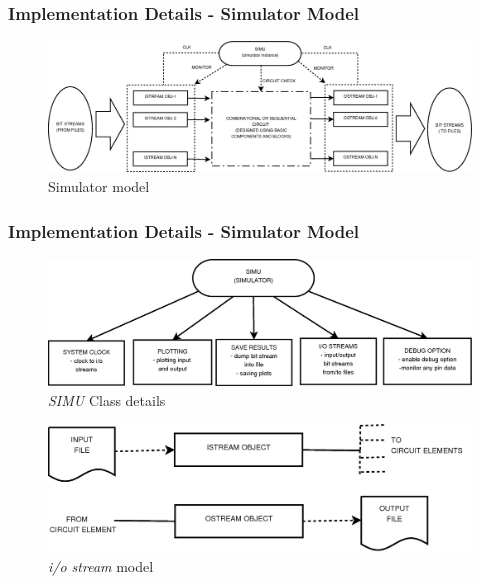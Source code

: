 \documentclass[10pt,red]{beamer}
\begin{document}
\begin{frame}
 \frametitle{Implementation Details - Simulator Model}
  \begin{figure}
   \begin{center}
   \includegraphics[scale=0.2]{syst_model.png}
   \caption{\scriptsize{Simulator model }}
  \end{center}
  \end{figure}

\end{frame}



\begin{frame}

 \frametitle{Implementation Details - Simulator Model}

  \begin{figure}
   \begin{center}
   \includegraphics[scale=0.2]{simu_model.png}
    \caption{\scriptsize{\emph{SIMU} Class details }}
  \end{center}
  \end{figure}



 \begin{figure}
   \begin{center}
   \includegraphics[scale=0.2]{iostream.png}
    \caption{\scriptsize{\emph{i/o stream} model }}
  \end{center}
  \end{figure}

\end{frame}
\end{document}
